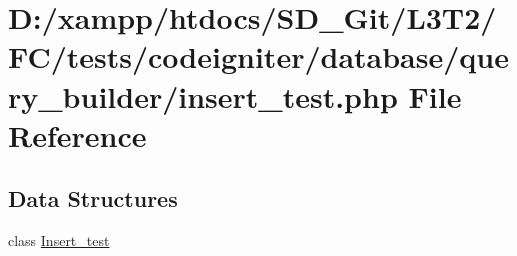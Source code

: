 \hypertarget{tests_2codeigniter_2database_2query__builder_2insert__test_8php}{}\section{D\+:/xampp/htdocs/\+S\+D\+\_\+\+Git/\+L3\+T2/\+F\+C/tests/codeigniter/database/query\+\_\+builder/insert\+\_\+test.php File Reference}
\label{tests_2codeigniter_2database_2query__builder_2insert__test_8php}
\subsection*{Data Structures}
\begin{DoxyCompactItemize}
\item 
class \hyperlink{class_insert__test}{Insert\+\_\+test}
\end{DoxyCompactItemize}
